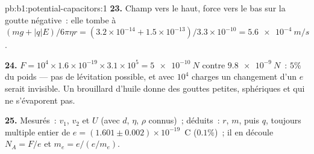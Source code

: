 \begin{solution}{pb:b1:potential-capacitors:1}
\textbf{23.} Champ vers le haut, force vers le bas sur la goutte négative~: elle tombe à $(mg
+ |q|E)/6\pi\eta r = (3.2 \times 10^{-14} + 1.5 \times 10^{-13})/3.3 \times 10^{-10} =
\qty{5.6e-4}{m/s}$.

\textbf{24.} $F = 10^4 \times 1.6 \times 10^{-19} \times 3.1 \times 10^5 = \qty{5e-10}{N}$
contre $\qty{9.8e-9}{N}$~: $5\%$ du poids --- pas de lévitation possible, et avec
$10^4$ charges un changement d'un $e$ serait invisible. Un brouillard d'huile
donne des gouttes petites, sphériques et qui ne s'évaporent pas.

\textbf{25.} Mesurés~: $v_1$, $v_2$ et $U$ (avec $d$, $\eta$, $\rho$ connus)~;
déduits~: $r$, $m$, puis $q$, toujours multiple entier de
$e = (1.601 \pm 0.002) \times 10^{-19}$~C ($0.1\%$)~; il en découle $N_A = F/e$ et
$m_e = e/(e/m_e)$.
\end{solution}
